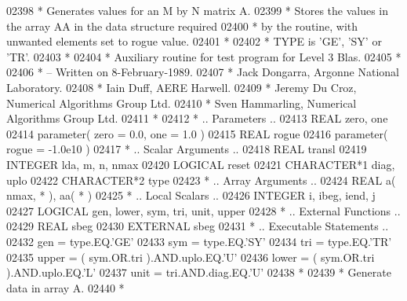 \begin{DoxyCode}
02398 \textcolor{comment}{*  Generates values for an M by N matrix A.}
02399 \textcolor{comment}{*  Stores the values in the array AA in the data structure required}
02400 \textcolor{comment}{*  by the routine, with unwanted elements set to rogue value.}
02401 \textcolor{comment}{*}
02402 \textcolor{comment}{*  TYPE is 'GE', 'SY' or 'TR'.}
02403 \textcolor{comment}{*}
02404 \textcolor{comment}{*  Auxiliary routine for test program for Level 3 Blas.}
02405 \textcolor{comment}{*}
02406 \textcolor{comment}{*  -- Written on 8-February-1989.}
02407 \textcolor{comment}{*     Jack Dongarra, Argonne National Laboratory.}
02408 \textcolor{comment}{*     Iain Duff, AERE Harwell.}
02409 \textcolor{comment}{*     Jeremy Du Croz, Numerical Algorithms Group Ltd.}
02410 \textcolor{comment}{*     Sven Hammarling, Numerical Algorithms Group Ltd.}
02411 \textcolor{comment}{*}
02412 \textcolor{comment}{*     .. Parameters ..}
02413       \textcolor{keywordtype}{REAL}               zero, one
02414       parameter( zero = 0.0, one = 1.0 )
02415       \textcolor{keywordtype}{REAL}               rogue
02416       parameter( rogue = -1.0e10 )
02417 \textcolor{comment}{*     .. Scalar Arguments ..}
02418       \textcolor{keywordtype}{REAL}               transl
02419       \textcolor{keywordtype}{INTEGER}            lda, m, n, nmax
02420       \textcolor{keywordtype}{LOGICAL}            reset
02421       \textcolor{keywordtype}{CHARACTER*1}        diag, uplo
02422       \textcolor{keywordtype}{CHARACTER*2}        type
02423 \textcolor{comment}{*     .. Array Arguments ..}
02424       \textcolor{keywordtype}{REAL}               a( nmax, * ), aa( * )
02425 \textcolor{comment}{*     .. Local Scalars ..}
02426       \textcolor{keywordtype}{INTEGER}            i, ibeg, iend, j
02427       \textcolor{keywordtype}{LOGICAL}            gen, lower, sym, tri, unit, upper
02428 \textcolor{comment}{*     .. External Functions ..}
02429       \textcolor{keywordtype}{REAL}               sbeg
02430       \textcolor{keywordtype}{EXTERNAL}           sbeg
02431 \textcolor{comment}{*     .. Executable Statements ..}
02432       gen = type.EQ.\textcolor{stringliteral}{'GE'}
02433       sym = type.EQ.\textcolor{stringliteral}{'SY'}
02434       tri = type.EQ.\textcolor{stringliteral}{'TR'}
02435       upper = ( sym.OR.tri ).AND.uplo.EQ.\textcolor{stringliteral}{'U'}
02436       lower = ( sym.OR.tri ).AND.uplo.EQ.\textcolor{stringliteral}{'L'}
02437       unit = tri.AND.diag.EQ.\textcolor{stringliteral}{'U'}
02438 \textcolor{comment}{*}
02439 \textcolor{comment}{*     Generate data in array A.}
02440 \textcolor{comment}{*}

\end{DoxyCode}
